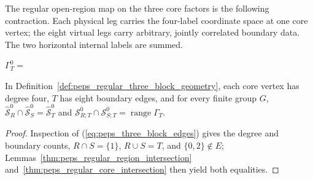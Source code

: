 The regular open-region map on the three core factors is the following
contraction. Each physical leg carries the four-label coordinate space at
one core vertex; the eight virtual legs carry arbitrary, jointly correlated
boundary data. The two horizontal internal labels are summed.
\begin{tenkzequation}
    \tenkzkernel
    $\Gamma_T^0=$
    \begin{tenkz}[lattice={1x3}, frame=plane, physical=up] %
    \end{tenkz}
\end{tenkzequation}

\begin{lemma}%
    \label{thm:peps_regular_three_block_intersection}
    \leanok
    In Definition~\ref{def:peps_regular_three_block_geometry}, each core
    vertex has degree four, $T$ has eight boundary edges, and for every
    finite group $G$,
    $\widehat{\mathcal S}_R^0\cap\widehat{\mathcal S}_S^0
        =\widehat{\mathcal S}_T^0$ and
    $\mathcal S_{R;T}^0\cap\mathcal S_{S;T}^0
        =\operatorname{range}\Gamma_T$.
\end{lemma}
\begin{proof}\leanok
    Inspection of (\ref{eq:peps_three_block_edges}) gives the degree and
    boundary counts, $R\cap S=\{1\}$, $R\cup S=T$, and $\{0,2\}\notin E$;
    Lemmas~\ref{thm:peps_regular_region_intersection}
    and~\ref{thm:peps_regular_core_intersection} then yield both equalities.
\end{proof}
